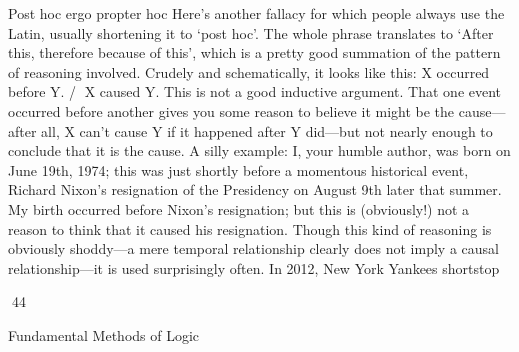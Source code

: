 Post hoc ergo propter hoc
Here’s another fallacy for which people always use the Latin, usually shortening it to ‘post hoc’.
The whole phrase translates to ‘After this, therefore because of this’, which is a pretty good
summation of the pattern of reasoning involved. Crudely and schematically, it looks like this:
X occurred before Y.
/ X caused Y.
This is not a good inductive argument. That one event occurred before another gives you some
reason to believe it might be the cause—after all, X can’t cause Y if it happened after Y did—but
not nearly enough to conclude that it is the cause. A silly example: I, your humble author, was
born on June 19th, 1974; this was just shortly before a momentous historical event, Richard Nixon’s
resignation of the Presidency on August 9th later that summer. My birth occurred before Nixon’s
resignation; but this is (obviously!) not a reason to think that it caused his resignation.
Though this kind of reasoning is obviously shoddy—a mere temporal relationship clearly does not
imply a causal relationship—it is used surprisingly often. In 2012, New York Yankees shortstop

44

Fundamental Methods of Logic

